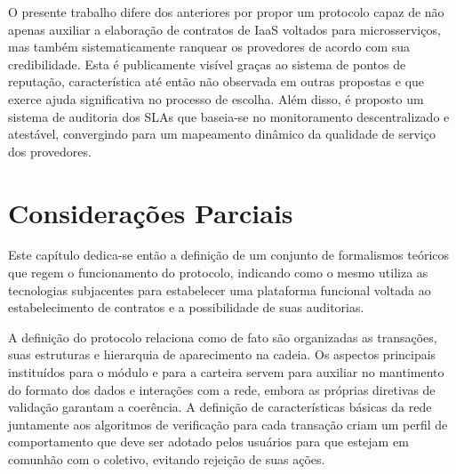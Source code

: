 %
O presente trabalho difere dos anteriores por propor um protocolo capaz de não apenas auxiliar a elaboração de contratos de \ac{IaaS} voltados para microsserviços, mas também sistematicamente ranquear os provedores de acordo com sua credibilidade. Esta é publicamente visível graças ao sistema de pontos de reputação, característica até então não observada em outras propostas e que exerce ajuda significativa no processo de escolha. Além disso, é proposto um sistema de auditoria dos \acp{SLA} que baseia-se no monitoramento descentralizado e atestável, convergindo para um mapeamento dinâmico da qualidade de serviço dos provedores. 

\section{Considerações Parciais}
\label{sec:proposta:consideracoes}

Este capítulo dedica-se então a definição de um conjunto de formalismos teóricos que regem o funcionamento do protocolo, indicando como o mesmo utiliza as tecnologias subjacentes para estabelecer uma plataforma funcional voltada ao estabelecimento de contratos e a possibilidade de suas auditorias.

%
A definição do protocolo relaciona como de fato são organizadas as transações, suas estruturas e hierarquia de aparecimento na cadeia. Os aspectos principais instituídos para o módulo e para a carteira servem para auxiliar no mantimento do formato dos dados e interações com a rede, embora as próprias diretivas de validação garantam a coerência. A definição de características básicas da rede juntamente aos algoritmos de verificação para cada transação criam um perfil de comportamento que deve ser adotado pelos usuários para que estejam em comunhão com o coletivo, evitando rejeição de suas ações.

%


